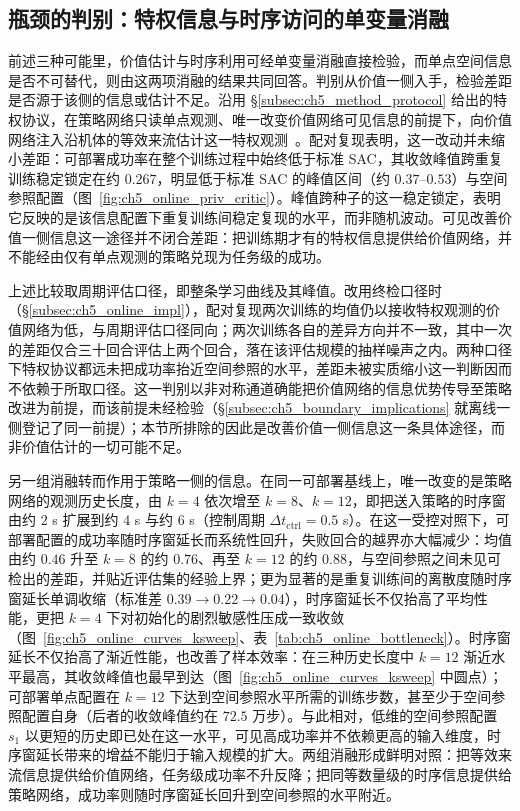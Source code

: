 \subsection{瓶颈的判别：特权信息与时序访问的单变量消融}\label{subsec:ch5_online_ablation}

前述三种可能里，价值估计与时序利用可经单变量消融直接检验，而单点空间信息是否不可替代，则由这两项消融的结果共同回答。判别从价值一侧入手，检验差距是否源于该侧的信息或估计不足。沿用 \S\ref{subsec:ch5_method_protocol} 给出的特权协议，在策略网络只读单点观测、唯一改变价值网络可见信息的前提下，向价值网络注入沿机体的等效来流估计这一特权观测~\citep{pinto2017asymmetric}。配对复现表明，这一改动并未缩小差距：可部署成功率在整个训练过程中始终低于标准 SAC，其收敛峰值跨重复训练稳定锁定在约 $0.267$，明显低于标准 SAC 的峰值区间（约 $0.37$–$0.53$）与空间参照配置（图~\ref{fig:ch5_online_priv_critic}）。峰值跨种子的这一稳定锁定，表明它反映的是该信息配置下重复训练间稳定复现的水平，而非随机波动。可见改善价值一侧信息这一途径并不闭合差距：把训练期才有的特权信息提供给价值网络，并不能经由仅有单点观测的策略兑现为任务级的成功。

上述比较取周期评估口径，即整条学习曲线及其峰值。改用终检口径时（\S\ref{subsec:ch5_online_impl}），配对复现两次训练的均值仍以接收特权观测的价值网络为低，与周期评估口径同向；两次训练各自的差异方向并不一致，其中一次的差距仅合三十回合评估上两个回合，落在该评估规模的抽样噪声之内。两种口径下特权协议都远未把成功率抬近空间参照的水平，差距未被实质缩小这一判断因而不依赖于所取口径。这一判别以非对称通道确能把价值网络的信息优势传导至策略改进为前提，而该前提未经检验（\S\ref{subsec:ch5_boundary_implications} 就离线一侧登记了同一前提）；本节所排除的因此是改善价值一侧信息这一条具体途径，而非价值估计的一切可能不足。

另一组消融转而作用于策略一侧的信息。在同一可部署基线上，唯一改变的是策略网络的观测历史长度，由 $k=4$ 依次增至 $k=8$、$k=12$，即把送入策略的时序窗由约 $2$ s 扩展到约 $4$ s 与约 $6$ s（控制周期 $\Delta t_{\mathrm{ctrl}}=0.5$ s）。在这一受控对照下，可部署配置的成功率随时序窗延长而系统性回升，失败回合的越界亦大幅减少：均值由约 $0.46$ 升至 $k=8$ 的约 $0.76$、再至 $k=12$ 的约 $0.88$，与空间参照之间未见可检出的差距，并贴近评估集的经验上界；更为显著的是重复训练间的离散度随时序窗延长单调收缩（标准差 $0.39\to0.22\to0.04$），时序窗延长不仅抬高了平均性能，更把 $k=4$ 下对初始化的剧烈敏感性压成一致收敛（图~\ref{fig:ch5_online_curves_ksweep}、表~\ref{tab:ch5_online_bottleneck}）。时序窗延长不仅抬高了渐近性能，也改善了样本效率：在三种历史长度中 $k=12$ 渐近水平最高，其收敛峰值也最早到达（图~\ref{fig:ch5_online_curves_ksweep} 中圆点）；可部署单点配置在 $k=12$ 下达到空间参照水平所需的训练步数，甚至少于空间参照配置自身（后者的收敛峰值约在 $72.5$ 万步）。与此相对，低维的空间参照配置 $s_1$ 以更短的历史即已处在这一水平，可见高成功率并不依赖更高的输入维度，时序窗延长带来的增益不能归于输入规模的扩大。两组消融形成鲜明对照：把等效来流信息提供给价值网络，任务级成功率不升反降；把同等数量级的时序信息提供给策略网络，成功率则随时序窗延长回升到空间参照的水平附近。

